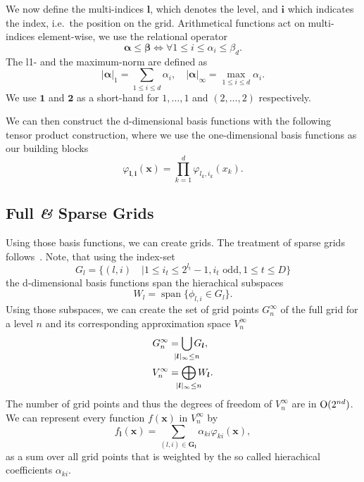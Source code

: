 We now define the multi-indices \(\bm{l}\), which denotes the level, and \(\bm{i}\) which indicates the index, i.e.~the position on the grid.
Arithmetical functions act on multi-indices element-wise, we use the relational operator
\begin{equation*}
  \bm{\alpha} \leq \bm{\beta} \iff \forall 1 \leq i \leq \alpha_i \leq \beta_d.
\end{equation*}
The l1- and the maximum-norm are defined as
\begin{equation*}
  \vert \bm{\alpha} \vert_1 = \sum_{1 \leq i \leq d} \alpha_i, \quad \vert \bm{\alpha} \vert_\infty = \max_{1 \leq i \leq d} \alpha_i .
\end{equation*}
We use \(\bm{1}\) and \(\bm{2}\) as a short-hand for \(1, \ldots, 1\) and
\((2, \ldots, 2)\) respectively.

We can then construct the d-dimensional basis functions with the following tensor product construction, where we use the one-dimensional basis functions as our building blocks
\begin{equation*}
\varphi_{\bm{l}, \bm{i}} (\bm{x}) = \prod_{k=1}^d \varphi_{l_k, i_k} (x_k).
\end{equation*}

\subsection{Full \textit{\&} Sparse Grids}
Using those basis functions, we can create grids.
The treatment of sparse grids follows~\cite{bungartzSparse}.
Note, that using the index-set
\begin{equation*}
 G_l = \{(l,i) \quad | 1 \leq i_t \leq 2^{l_t} -1, i_t \text{ odd}, 1 \leq t \leq D\}
\end{equation*}
the d-dimensional basis functions span the hierachical subspaces
\begin{equation*}
  W_l = \operatorname{span}\{\phi_{l,i} \in G_l\}.
\end{equation*}
Using those subspaces, we can create the set of grid points \(G_n^\infty\) of the full grid for a level \(n\) and its corresponding approximation space \(V_n^\infty\)
\begin{align}
  G_n^\infty &= \bigcup_{\mathclap{\vert {\bm{l}} \vert_\infty \leq n}} G_{\bm{l}}, \\
  V_n^\infty &= \bigoplus_{\mathclap{\vert {\bm{l}} \vert_\infty \leq n}} W_{\bm{l}}.
\end{align}
The number of grid points and thus the degrees of freedom of \(V_n^\infty\) are in \( \operatorname{O} (2^{nd})\).
We can represent every function \(f(\bm{x})\) in \(V_n^\infty\) by
\begin{equation}\label{eq:coefficients-h2mix}
  f_{\bm{l}}(\bm{x}) = \sum_{(l,i) \in \bm{G_l}} \alpha_{ki} \varphi_{ki}(\bm{x}),
\end{equation}
as a sum over all grid points that is weighted by the so called hierachical coefficients \(\alpha_{ki}\).

